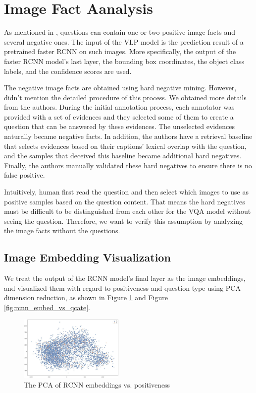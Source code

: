 \documentclass[nohyperref]{article}
\theoremstyle{plain}
\theoremstyle{definition}
\theoremstyle{remark}
\begin{document}
    \section{Image Fact Aanalysis}

    As mentioned in \cite{webqa}, questions can contain one or two positive image facts and several negative ones.
    The input of the VLP model is the prediction result of a pretrained faster RCNN on such images.
    More specifically, the output of the faster RCNN model's last layer, the bounding
    box coordinates, the object class labels, and the confidence scores are used.

    The negative image facts are obtained using hard negative mining.
    However, \cite{webqa} didn't mention the detailed procedure of this process.
    We obtained more details from the authors.
    During the initial annotation process, each annotator was provided with a set of evidences and
    they selected some of them to create a question that can be answered by these evidences.
    The unselected evidences naturally became negative facts.
    In addition, the authors have a retrieval baseline that selects evidences based on their captions' lexical overlap
    with the question, and the samples that deceived this baseline became additional hard negatives.
    Finally, the authors manually validated these hard negatives to ensure there is no false positive.

    Intuitively, human first read the question and then select which images to use as positive samples based on the
    question content.
    That means the hard negatives must be difficult to be distinguished from each other for the VQA model
    without seeing the question.
    Therefore, we want to verify this assumption by analyzing the image facts without the questions.

    \subsection{Image Embedding Visualization}

    We treat the output of the RCNN model's final layer as the image embeddings, and visualized them with regard to
    positiveness and question type using PCA dimension reduction, as shown in Figure \ref{fig:rcnn_embed_vs_pos_neg} and
    Figure \ref{fig:rcnn_embed_vs_qcate}.

    \begin{figure}[h]
        \center
        \includegraphics[width=0.45\textwidth]{img/rcnn_embed_vs_pos_neg.jpg}
        \caption{The PCA of RCNN embeddings vs. positiveness}
        \label{fig:rcnn_embed_vs_pos_neg}
    \end{figure}
\end{document}
